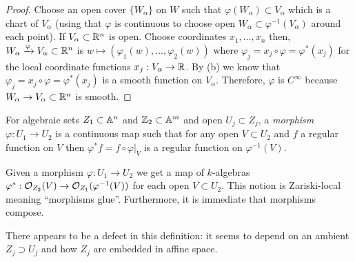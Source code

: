 \documentclass[12pt]{article}
\begin{document}
\begin{proof}
Choose an open cover $\{ W_\alpha \}$ on $W$ such that $\varphi(W_\alpha) \subset V_\alpha$ which is a chart of $V_\alpha$ (using that $\varphi$ is continuous to choose open $W_\alpha \subset \varphi^{-1}(V_\alpha)$ around each point). If $V_\alpha \subset \mathbb{R}^n$ is open. Choose coordinates $x_1, \dots, x_n$ then, $W_\alpha \xrightarrow{\varphi} V_\alpha \subset \mathbb{R}^n$ is $w \mapsto (\varphi_1(w), \dots, \varphi_2(w))$ where $\varphi_j = x_j \circ \varphi = \varphi^*(x_j)$ for the local coordinate functions $x_j : V_\alpha \to \mathbb{R}$. By (b) we know that $\varphi_j = x_j \circ \varphi = \varphi^*(x_j)$ is a smooth function on $V_\alpha$. Therefore, $\varphi$ is $C^\infty$ because $W_\alpha \to V_\alpha \subset \mathbb{R}^n$ is smooth.
\end{proof}

\begin{defn}
For algebraic sets $Z_1 \subset \mathbb{A}^n$ and $\mathbb{Z}_2 \subset \mathbb{A}^m$ and open $U_j \subset Z_j$, a \textit{morphism} $\varphi : U_1 \to U_2$ is a continuous map such that for any open $V \subset U_2$ and $f$ a regular function on $V$ then $\varphi^* f = f \circ \varphi|_V$ is a regular function on $\varphi^{-1}(V)$.
\end{defn}

\begin{rmk}
Given a morphism $\varphi : U_1 \to U_2$ we get a map of $k$-algebras $\varphi^* : \mathcal{O}_{Z_2}(V) \to \mathcal{O}_{Z_1}(\varphi^{-1}(V))$  for each open $V \subset U_2$. This notion is Zariski-local meaning ``morphisms glue''. Furthermore, it is immediate that morphisms compose.
\end{rmk}

\begin{rmk}
There appears to be a defect in this definition: it seems to depend on an ambient $Z_j \supset U_j$ and how $Z_j$ are embedded in affine space.
\end{rmk}
\end{document}
